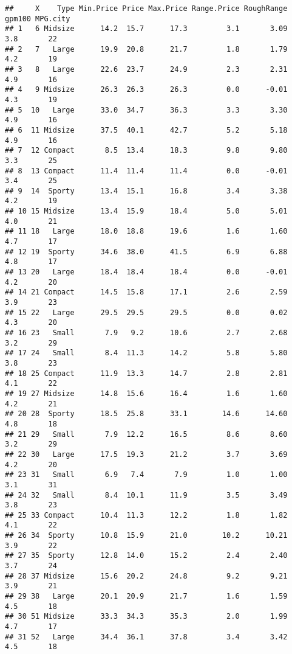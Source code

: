 \documentclass[
]{article}
\begin{document}
\begin{verbatim}
##     X    Type Min.Price Price Max.Price Range.Price RoughRange gpm100 MPG.city
## 1   6 Midsize      14.2  15.7      17.3         3.1       3.09    3.8       22
## 2   7   Large      19.9  20.8      21.7         1.8       1.79    4.2       19
## 3   8   Large      22.6  23.7      24.9         2.3       2.31    4.9       16
## 4   9 Midsize      26.3  26.3      26.3         0.0      -0.01    4.3       19
## 5  10   Large      33.0  34.7      36.3         3.3       3.30    4.9       16
## 6  11 Midsize      37.5  40.1      42.7         5.2       5.18    4.9       16
## 7  12 Compact       8.5  13.4      18.3         9.8       9.80    3.3       25
## 8  13 Compact      11.4  11.4      11.4         0.0      -0.01    3.4       25
## 9  14  Sporty      13.4  15.1      16.8         3.4       3.38    4.2       19
## 10 15 Midsize      13.4  15.9      18.4         5.0       5.01    4.0       21
## 11 18   Large      18.0  18.8      19.6         1.6       1.60    4.7       17
## 12 19  Sporty      34.6  38.0      41.5         6.9       6.88    4.8       17
## 13 20   Large      18.4  18.4      18.4         0.0      -0.01    4.2       20
## 14 21 Compact      14.5  15.8      17.1         2.6       2.59    3.9       23
## 15 22   Large      29.5  29.5      29.5         0.0       0.02    4.3       20
## 16 23   Small       7.9   9.2      10.6         2.7       2.68    3.2       29
## 17 24   Small       8.4  11.3      14.2         5.8       5.80    3.8       23
## 18 25 Compact      11.9  13.3      14.7         2.8       2.81    4.1       22
## 19 27 Midsize      14.8  15.6      16.4         1.6       1.60    4.2       21
## 20 28  Sporty      18.5  25.8      33.1        14.6      14.60    4.8       18
## 21 29   Small       7.9  12.2      16.5         8.6       8.60    3.2       29
## 22 30   Large      17.5  19.3      21.2         3.7       3.69    4.2       20
## 23 31   Small       6.9   7.4       7.9         1.0       1.00    3.1       31
## 24 32   Small       8.4  10.1      11.9         3.5       3.49    3.8       23
## 25 33 Compact      10.4  11.3      12.2         1.8       1.82    4.1       22
## 26 34  Sporty      10.8  15.9      21.0        10.2      10.21    3.9       22
## 27 35  Sporty      12.8  14.0      15.2         2.4       2.40    3.7       24
## 28 37 Midsize      15.6  20.2      24.8         9.2       9.21    3.9       21
## 29 38   Large      20.1  20.9      21.7         1.6       1.59    4.5       18
## 30 51 Midsize      33.3  34.3      35.3         2.0       1.99    4.7       17
## 31 52   Large      34.4  36.1      37.8         3.4       3.42    4.5       18

\end{verbatim}
\end{document}
